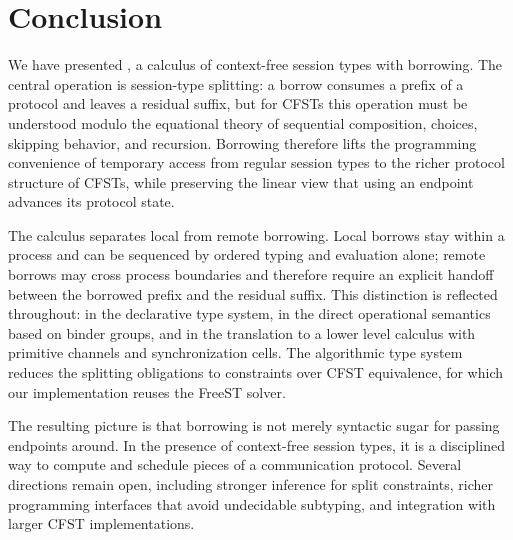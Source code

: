 
\section{Conclusion}
\label{sec:conclusion}

We have presented \thecalculus, a calculus of context-free session
types with borrowing.  The central operation is session-type
splitting: a borrow consumes a prefix of a protocol and leaves a
residual suffix, but for CFSTs this operation must be understood
modulo the equational theory of sequential composition, choices,
skipping behavior, and recursion.  Borrowing therefore lifts the
programming convenience of temporary access from regular session types
to the richer protocol structure of CFSTs, while preserving the
linear view that using an endpoint advances its protocol state.

The calculus separates local from remote borrowing.  Local borrows
stay within a process and can be sequenced by ordered typing and
evaluation alone; remote borrows may cross process boundaries and
therefore require an explicit handoff between the borrowed prefix and
the residual suffix.  This distinction is reflected throughout: in the declarative type system, in the direct operational 
semantics based on binder groups, and in the translation to a lower
level calculus with primitive channels and synchronization cells.  The
algorithmic type system reduces the splitting obligations to
constraints over CFST equivalence, for which our implementation
reuses the FreeST solver.

The resulting picture is that borrowing is not merely syntactic
sugar for passing endpoints around.  In the presence of context-free
session types, it is a disciplined way to compute and schedule pieces
of a communication protocol.  Several directions remain open,
including stronger inference for split constraints, richer programming
interfaces that avoid undecidable subtyping, and integration with
larger CFST implementations.



